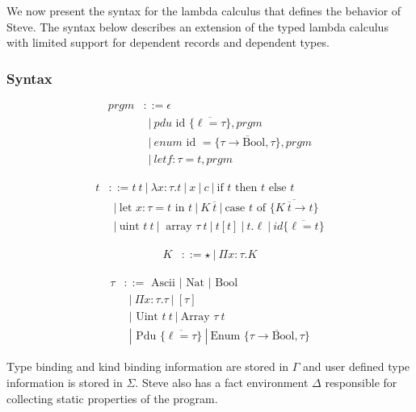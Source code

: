 We now present the syntax for the lambda calculus that defines the behavior of
Steve. The syntax below describes an extension of the typed lambda calculus with
limited support for dependent records and dependent types.

\subsubsection{Syntax}
  \begin{flushleft}
  \begin{align*}
  prgm &::= \epsilon\\
     &~~|~ pdu \mbox{ id } \{ \overline{\ell = \tau} \},prgm\\
     &~~|~ enum \mbox{ id } = \{\overline{\tau \rightarrow  \mbox{Bool}, \tau}\},prgm\\
     &~~|~ let f:\tau = t, prgm
  \end{align*}
\end{flushleft}
  \begin{flushleft}
  \begin{align*}
  t &::= t~t ~|~ \lambda x:\tau.t ~|~ x ~|~ c ~|~
    \mbox{if } t \mbox{ then } t \mbox{ else } t \\
     &~~|~
    \mbox{let } x:\tau = t \mbox{ in } t ~|~ 
    K~\overline{t} ~|~
    \mbox{case } t \mbox{ of } \{
      \overline{K~\overline{t} \rightarrow t} \}\\
    &~~|~
    \mbox{uint } t~t ~|~ \mbox{ array } \tau~t ~|~ t[t] ~|~ t.\ell ~|~
    id \{ \overline{\ell = t} \}
  \end{align*}
\end{flushleft}

\begin{flushleft}
   \begin{align*}
      K &::= \star ~|~ \Pi x:\tau.K
   \end{align*}

  \begin{align*}
    \tau &::= \mbox{ Ascii } | \mbox{ Nat } | \mbox{ Bool } \\
         &~~|~ \Pi x:\tau.\tau ~|~ [\tau] \\
         &~~| \mbox{ Uint } t~t ~|~ \mbox{Array } \tau~t \\
         &~~| \mbox{ Pdu } \{\overline{\ell = \tau}\} ~|~ 
         \mbox{Enum } \{\overline{\tau \rightarrow  \mbox{Bool}, \tau}\} 
  \end{align*}
\end{flushleft}

Type binding and kind binding information are stored in $\Gamma$ and user defined type information is stored in $\Sigma$. Steve also has a fact environment $\Delta$ responsible for collecting static properties of the program.
